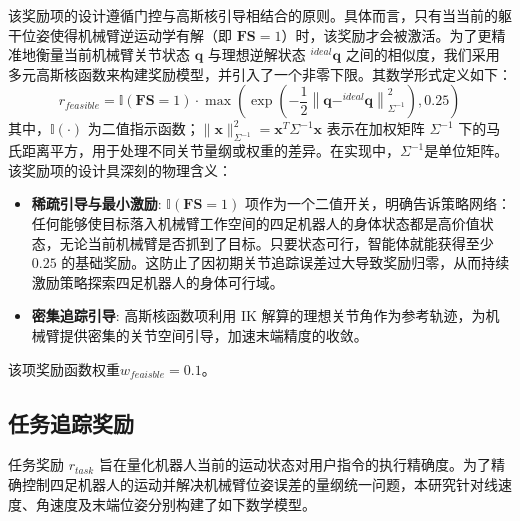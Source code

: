 该奖励项的设计遵循门控与高斯核引导相结合的原则。具体而言，只有当当前的躯干位姿使得机械臂逆运动学有解（即 $\boldsymbol{FS}=1$）时，该奖励才会被激活。为了更精准地衡量当前机械臂关节状态 $\mathbf{q}$ 与理想逆解状态 $^{ideal}\mathbf{q}$ 之间的相似度，我们采用多元高斯核函数来构建奖励模型，并引入了一个非零下限。其数学形式定义如下：
\begin{equation}
    r_{feasible} = \mathbb{I}(\boldsymbol{FS}=1) \cdot \max\left( \exp\left( - \frac{1}{2} \left\| \mathbf{q} - ^{ideal}\mathbf{q} \right\|^2_{\Sigma^{-1}} \right), 0.25 \right)
\end{equation}
其中，$\mathbb{I}(\cdot)$ 为二值指示函数；$\|\mathbf{x}\|^2_{\Sigma^{-1}} = \mathbf{x}^T \Sigma^{-1} \mathbf{x}$ 表示在加权矩阵 $\Sigma^{-1}$ 下的马氏距离平方，用于处理不同关节量纲或权重的差异。在实现中，$\Sigma^{-1}$是单位矩阵。
该奖励项的设计具深刻的物理含义：
\begin{itemize}
    \item \textbf{稀疏引导与最小激励}: $\mathbb{I}(\boldsymbol{FS}=1)$ 项作为一个二值开关，明确告诉策略网络：任何能够使目标落入机械臂工作空间的四足机器人的身体状态都是高价值状态，无论当前机械臂是否抓到了目标。只要状态可行，智能体就能获得至少 $0.25$ 的基础奖励。这防止了因初期关节追踪误差过大导致奖励归零，从而持续激励策略探索四足机器人的身体可行域。
    \item \textbf{密集追踪引导}: 高斯核函数项利用 IK 解算的理想关节角作为参考轨迹，为机械臂提供密集的关节空间引导，加速末端精度的收敛。
\end{itemize}

该项奖励函数权重$w_{feaisble}=0.1$。

\subsection{任务追踪奖励}
任务奖励 $r_{task}$ 旨在量化机器人当前的运动状态对用户指令的执行精确度。为了精确控制四足机器人的运动并解决机械臂位姿误差的量纲统一问题，本研究针对线速度、角速度及末端位姿分别构建了如下数学模型。

